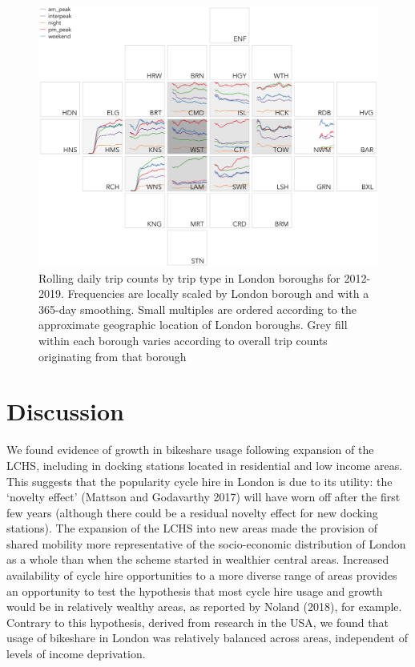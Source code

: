 \documentclass[]{article}
\begin{document}
\begin{figure}

{\centering \includegraphics[width=1\linewidth]{figures/trip_types_by_borough_minor} 

}

\caption{Rolling daily trip counts by trip type in London boroughs for 2012-2019. Frequencies are locally scaled by London borough and with a 365-day smoothing. Small multiples are ordered according to the approximate geographic location of London boroughs. Grey fill within each borough varies according to overall trip counts originating from that borough}\label{fig:trip-types-boroughs}
\end{figure}

\hypertarget{discussion}{%
\section{Discussion}\label{discussion}}

We found evidence of growth in bikeshare usage following expansion of the LCHS, including in docking stations located in residential and low income areas.
This suggests that the popularity cycle hire in London is due to its utility:
the `novelty effect' (Mattson and Godavarthy 2017) will have worn off after the first few years (although there could be a residual novelty effect for new docking stations).
The expansion of the LCHS into new areas made the provision of shared mobility more representative of the socio-economic distribution of London as a whole than when the scheme started in wealthier central areas.
Increased availability of cycle hire opportunities to a more diverse range of areas provides an opportunity to test the hypothesis that most cycle hire usage and growth would be in relatively wealthy areas, as reported by Noland (2018), for example.
Contrary to this hypothesis, derived from research in the USA, we found that usage of bikeshare in London was relatively balanced across areas, independent of levels of income deprivation.
\end{document}
